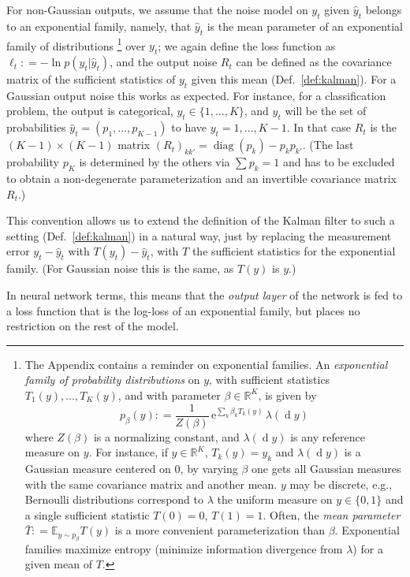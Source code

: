 \documentclass[11pt,a4paper]{article}
\def\d{\operatorname{d}\!{}}
\def\R{{\mathbb{R}}}
\newcommand{\deq}{\mathrel{\mathop{:}}=}
\newcommand{\E}{\mathbb{E}}
\DeclareMathOperator{\diag}{diag}
\newcommand{\1}{\mathbbm{1}}
\theoremstyle{yannthm}
\theoremstyle{yannthm2}
\numberwithin{equation}{section}
\begin{document}
For non-Gaussian outputs, we assume that the noise model
on
$y_t$ given $\hat y_t$ belongs to an exponential family,
namely, that $\hat y_t$ is the
mean parameter of an exponential family of distributions
\footnote{
The Appendix contains a reminder on exponential families. An \emph{exponential family of probability distributions} on $y$, with sufficient statistics
$T_1(y),\ldots,T_K(y)$, and with parameter $\beta\in \R^K$, is given by
\begin{equation}
p_\beta(y)\deq\frac{1}{Z(\beta)}\,\mathrm{e}^{\sum_k \beta_k
T_k(y)}\,\lambda(\d y)
\end{equation}
where $Z(\beta)$ is a normalizing constant, and $\lambda(\d y)$ is any
reference
measure on $y$. For instance, if $y\in \R^K$, $T_k(y)=y_k$ and $\lambda(\d y)$
is a Gaussian measure centered on $0$, by varying $\beta$ one gets all
Gaussian measures with the same covariance matrix and another mean. $y$ may be discrete,
e.g., 
Bernoulli distributions correspond to $\lambda$
the uniform measure on $y\in \{0,1\}$ and a single sufficient
statistic $T(0)=0$, $T(1)=1$. Often, the \emph{mean parameter} $\bar
T\deq\E_{y\sim p_\beta} T(y)$ is a more convenient parameterization than
$\beta$.  Exponential families maximize entropy (minimize information
divergence from $\lambda$) for a given
mean of $T$.}
over $y_t$; we again define the
loss function as $\ell_t\deq -\ln p(y_t|\hat y_t)$, and the output
noise $R_t$ can be defined 
as the covariance matrix of the sufficient statistics of $y_t$ given this
mean (Def.~\ref{def:kalman}). For a Gaussian output noise this works as expected. For instance, for a classification problem, the output is
categorical, $y_t\in\{1,\ldots, K\}$, and $\hat y_t$ will be the set of
probabilities $\hat y_t=(p_1,\ldots,p_{K-1})$ to have
$y_t=1,\ldots,{K-1}$. In that case $R_t$ is the $(K-1)\times (K-1)$ matrix
$(R_t)_{kk'}=\diag(p_k)-p_k p_{k'}$. (The last probability $p_K$ is
determined by the others via $\sum p_k=1$ and has to be excluded to
obtain a non-degenerate parameterization and an invertible covariance
matrix $R_t$.)

This convention allows us to
extend the definition of the Kalman filter to such a
setting (Def.~\ref{def:kalman}) in a natural way, just by replacing the measurement error
$y_t-\hat y_t$ with $T(y_t)-\hat y_t$, with $T$ the sufficient statistics
for the exponential family. (For Gaussian noise this is the same, as
$T(y)$ is $y$.)

In neural network terms, this means that the \emph{output layer} of the
network is fed to a loss function that is the log-loss of an exponential
family, but places no restriction on the rest of the model.
\end{document}
